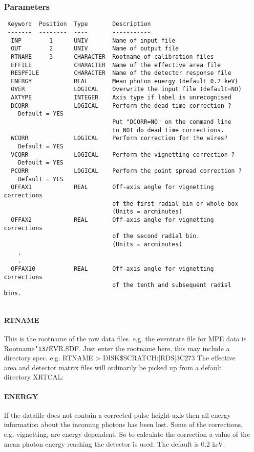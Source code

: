 \documentclass{book}
\renewcommand{\_}{{\tt\char'137}}     %
\begin{document}
\subsubsection{Parameters}
\begin{verbatim}
 Keyword  Position  Type       Description
 -------  --------  ----       -----------
  INP        1      UNIV       Name of input file
  OUT        2      UNIV       Name of output file
  RTNAME     3      CHARACTER  Rootname of calibration files
  EFFILE            CHARACTER  Name of the effective area file
  RESPFILE          CHARACTER  Name of the detector response file
  ENERGY            REAL       Mean photon energy (default 0.2 keV)
  OVER              LOGICAL    Overwrite the input file (default=NO)
  AXTYPE            INTEGER    Axis type if label is unrecognised
  DCORR             LOGICAL    Perform the dead time correction ?
    Default = YES
                               Put "DCORR=NO" on the command line
                               to NOT do dead time corrections.
  WCORR             LOGICAL    Perform correction for the wires?
    Default = YES
  VCORR             LOGICAL    Perform the vignetting correction ?
    Default = YES
  PCORR             LOGICAL    Perform the point spread correction ?
    Default = YES
  OFFAX1            REAL       Off-axis angle for vignetting corrections
                               of the first radial bin or whole box
                               (Units = arcminutes)
  OFFAX2            REAL       Off-axis angle for vignetting corrections
                               of the second radial bin.
                               (Units = arcminutes)
    .
    .
  OFFAX10           REAL       Off-axis angle for vignetting corrections
                               of the tenth and subsequent radial bins.
 
\end{verbatim}\paragraph{RTNAME}
This is the rootname of the raw data files. e.g. the eventrate file
for MPE data is Rootname\_EVR.SDF. Just enter the rootname here, this may
include a directory spec. e.g. RTNAME > DISK\$SCRATCH:[RDS]3C273
The effective area and detector matrix files will ordinarily be
picked up from a default directory XRTCAL:
 
\paragraph{ENERGY}
If the datafile does not contain a corrected pulse height axis then
all energy information about the incoming photons has been lost.
Some of the corrections, e.g. vignetting, are energy dependent. So
to calculate the correction a value of the mean photon energy
reaching the detector is used. The default is 0.2 keV.
 
\end{document}
